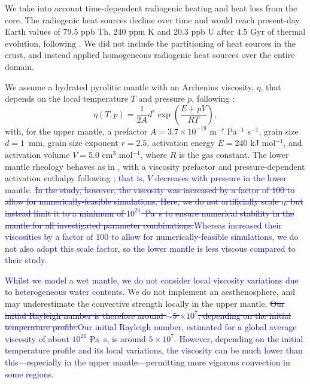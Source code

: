 \documentclass[3p,authoryear]{elsarticle}
\newcommand{\editthree}[2]{\textcolor{blue}{\sout{#1}#2}}
\begin{document}
We take into account time-dependent radiogenic heating and heat loss from the core. The radiogenic heat sources decline over time and would reach present-day Earth values of 79.5 ppb Th, 240 ppm K and 20.3 ppb U after 4.5 Gyr of thermal evolution, following \citet{schubert_turcotte_olson_2001}. We did not include the partitioning of heat sources in the crust, and instead applied homogeneous radiogenic heat sources over the entire domain.

We assume a hydrated pyrolitic mantle with an Arrhenius viscosity, $\eta$, that depends on the local temperature $T$ and pressure $p$, following \citet{Karato1993}:
\begin{equation}
    \eta(T,p) = \frac{1}{2 A} d^r \exp\left(\frac{E+pV}{RT}\right),
\end{equation}
with, for the upper mantle, a prefactor $A=3.7 \times 10^{-19}$ m$^{-r}$ Pa$^{-1}$ s$^{-1}$, grain size $d=1$~mm, grain size exponent $r=2.5$, activation energy $E=240$ kJ mol$^{-1}$, and activation volume $V=5.0$ cm$^{3}$ mol$^{-1}$, where $R$ is the gas constant. The lower mantle rheology behaves as in \citet{Noack2017}, with a viscosity prefactor and pressure-dependent activation enthalpy following \citet{Tackley2013}\editthree{}{; that is, $V$ decreases with pressure in the lower mantle}. \editthree{In the \citeauthor{Tackley2013} study, however, the viscosity was increased by a factor of 100 to allow for numerically-feasible simulations. Here, we do not artificially scale $\eta$, but instead limit it to a minimum of $10^{21}$~Pa~s to ensure numerical stability in the mantle for all investigated parameter combinations.}{Whereas \citet{Tackley2013} increased their viscosities by a factor of 100 to allow for numerically-feasible simulations, we do not also adopt this scale factor, so the lower mantle is less viscous compared to their study.}

\editthree{}{Whilst we model a wet mantle, we do not consider local viscosity variations due to heterogeneous water contents. }We do not implement an aesthenosphere, and may underestimate the convective strength locally in the upper mantle. \editthree{Our initial Rayleigh number is therefore around $\sim$5 $\times 10^7$, depending on the initial temperature profile.}{Our initial Rayleigh number, estimated for a global average viscosity of about $10^{21}$ Pa~s, is around $5\times10^7$. However, depending on the initial temperature profile and its local variations, the viscosity can be much lower than this---especially in the upper mantle---permitting more vigorous convection in some regions.}
\end{document}
